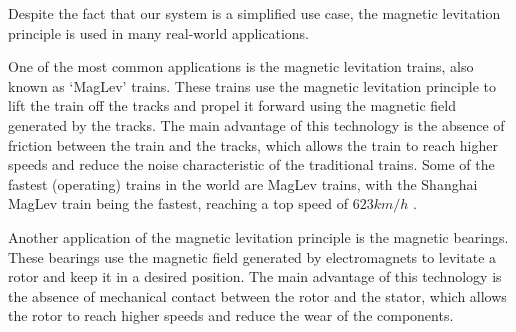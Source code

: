Despite the fact that our system is a simplified use case, the magnetic levitation principle is used in many real-world applications.

One of the most common applications is the magnetic levitation trains, also known as `MagLev' trains.
These trains use the magnetic levitation principle to lift the train off the tracks and propel it forward using the magnetic field generated by the tracks.
The main advantage of this technology is the absence of friction between the train and the tracks, which allows the train to reach higher speeds and reduce the noise characteristic of the traditional trains.
Some of the fastest (operating) trains in the world are MagLev trains, with the Shanghai MagLev train being the fastest, reaching a top speed of $623 km/h$ \cite{WikiSCMaglev}.

Another application of the magnetic levitation principle is the magnetic bearings.
These bearings use the magnetic field generated by electromagnets to levitate a rotor and keep it in a desired position.
The main advantage of this technology is the absence of mechanical contact between the rotor and the stator, which allows the rotor to reach higher speeds and reduce the wear of the components.





